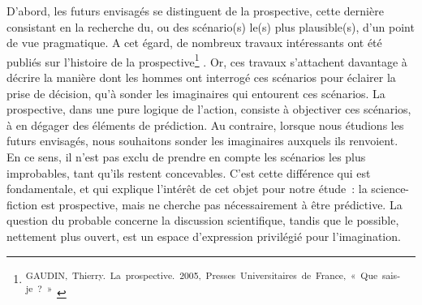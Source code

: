 \documentclass[letterpaper,portrait,12pt]{article}
\begin{document}
	D'abord, les futurs envisag\'{e}s se distinguent de la prospective, cette derni\`{e}re consistant en la recherche du, ou des sc\'{e}nario(s) le(s) plus plausible(s), d'un point de vue pragmatique. A cet \'{e}gard, de nombreux travaux int\'{e}ressants ont \'{e}t\'{e} publi\'{e}s sur l'histoire de la prospective\footnote{\textsuperscript{\newpage
}\textsuperscript{	GAUDIN,\ Thierry.\ La\ prospective.\ 2005,\ Presses\ Universitaires\ de\ France,\ «\ Que\ sais-je\ ?\ »\ }} . Or, ces travaux s'attachent davantage \`{a} d\'{e}crire la mani\`{e}re dont les hommes ont interrog\'{e} ces sc\'{e}narios pour \'{e}clairer la prise de d\'{e}cision, qu'\`{a} sonder les imaginaires qui entourent ces sc\'{e}narios. La prospective, dans une pure logique de l'action, consiste \`{a} objectiver ces sc\'{e}narios, \`{a} en d\'{e}gager des \'{e}l\'{e}ments de pr\'{e}diction. Au contraire, lorsque nous \'{e}tudions les futurs envisag\'{e}s, nous souhaitons sonder les imaginaires auxquels ils renvoient. En ce sens, il n'est pas exclu de prendre en compte les sc\'{e}narios les plus improbables, tant qu'ils restent concevables. C'est cette diff\'{e}rence qui est fondamentale, et qui explique l'int\'{e}r\^{e}t de cet objet pour notre \'{e}tude : la science-fiction est prospective, mais ne cherche pas n\'{e}cessairement \`{a} \^{e}tre pr\'{e}dictive. La question du probable concerne la discussion scientifique, tandis que le possible, nettement plus ouvert, est un espace d'expression privil\'{e}gi\'{e} pour l'imagination. 
\end{document}
